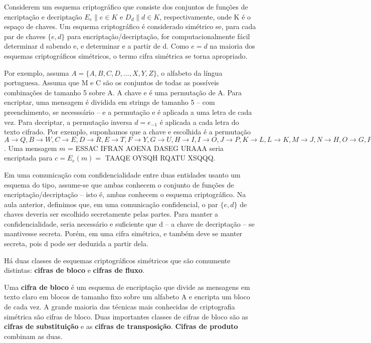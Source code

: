 \documentclass[
	10pt,				%
	openright,			%
	twoside,			%
	a5paper,			%
	english,			%
	french,				%
	spanish,			%
	brazil,				%
	sumario=tradicional
]{abntex2}
\begin{document}
Considerem um esquema criptográfico que consiste dos conjuntos de funções de encriptação e decriptação $E_e \| e \in K$ e $D_d \| d \in K$, respectivamente, onde K é o espaço de chaves. Um esquema criptográfico é considerado simétrico se, para cada par de chaves $\{ e, d \}$ para encriptação/decriptação, for computacionalmente fácil determinar d sabendo e, e determinar e a partir de d. Como $ e = d$ na maioria dos esquemas criptográficos simétricos, o termo cifra simétrica se torna apropriado.

Por exemplo, assuma $A = \{A, B, C, D, ..., X, Y, Z \}$, o alfabeto da língua portuguesa. Assuma que M e C são os conjuntos de todas as possíveis combinações de tamanho 5 sobre A. A chave e é uma permutação de A. Para encriptar, uma mensagem é dividida em strings de tamanho 5 – com preenchimento, se necesssário – e a permutação e é aplicada a uma letra de cada vez. Para decriptar, a permutação inversa $d = e_{-1}$ é aplicada a cada letra do texto cifrado. Por exemplo, suponhamos que a chave e escolhida é a permutação $A \to Q, B \to W, C \to E, D \to R, E \to T, F \to Y, G \to U, H \to I, I \to O, J \to P, K \to L, L \to K, M \to J, N \to H, O \to G, P \to F, Q \to D, R \to S, S \to A, T \to Z, U \to X, V \to C, W \to V, X \to B, Y \to N, Z \to M$. Uma mensagem $m$ = ESSAC IFRAN AOENA DASEG URAAA seria encriptada para $c = E_e (m) =$ TAAQE OYSQH RQATU XSQQQ.

Em uma comunicação com confidencialidade entre duas entidades usanto um esquema do tipo,  assume-se que ambas conhecem o conjunto de funções de encriptação/decriptação – isto é, ambas conhecem o esquema criptográfico. Na aula anterior, definimos que, em uma comunicação confidencial, o par $\{ e, d \}$ de chaves deveria ser escolhido secretamente pelas partes. Para manter a confidencialidade, seria necessário e suficiente que d – a chave de decriptação – se mantivesse secreta. Porém, em uma cifra simétrica, e também deve se manter secreta, pois d pode ser deduzida a partir dela.

Há duas classes de esquemas criptográficos simétricos que são comumente distintas: \textbf{cifras de bloco} e \textbf{cifras de fluxo}.

Uma \textbf{cifra de bloco} é um esquema de encriptação que divide as mensagens em texto claro em blocos de tamanho fixo sobre um alfabeto A e encripta um bloco de cada vez. A grande maioria das técnicas mais conhecidas de criptografia simétrica são cifras de bloco. Duas importantes classes de cifras de bloco são as \textbf{cifras de substituição} e as \textbf{cifras de transposição}. \textbf{Cifras de produto} combinam as duas.
\end{document}
